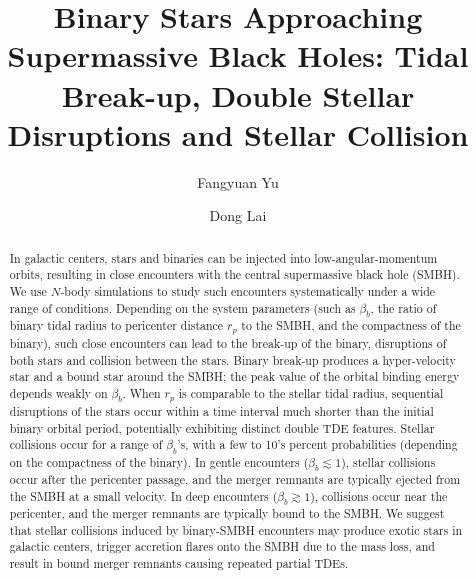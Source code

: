 \documentclass[twocolumn]{aastex631}
\begin{document}
\title{Binary Stars Approaching Supermassive Black Holes: Tidal Break-up, Double Stellar Disruptions and Stellar Collision}

\author[0009-0004-6973-3955]{Fangyuan Yu}

\author[0000-0002-1934-6250]{Dong Lai}

\begin{abstract}
In galactic centers, stars and binaries can be injected into low-angular-momentum orbits, resulting in close encounters with the central supermassive black hole (SMBH). 
We use $N$-body simulations to study such encounters systematically under a wide range of conditions.  
Depending on the system parameters (such as $\beta_b$, the ratio of binary tidal radius to pericenter distance $r_p$ to the SMBH, and the compactness of the binary), such close encounters can lead to the break-up of the binary, disruptions of both stars and collision between the stars. 
Binary break-up produces a hyper-velocity star and a bound star around the SMBH; the peak value of the orbital binding energy depends weakly on $\beta_b$. 
When $r_p$ is comparable to the stellar tidal radius, sequential disruptions of the stars occur within a time interval much shorter than the initial binary orbital period, potentially exhibiting distinct double TDE features. 
Stellar collisions occur for a range of $\beta_b$'s, with a few to 10's percent probabilities (depending on the compactness of the binary). 
In gentle encounters ($\beta_b\lesssim 1$), stellar collisions occur after the pericenter passage, and the merger remnants are typically ejected from the SMBH at a small velocity. 
In deep encounters ($\beta_b\gtrsim 1$), collisions occur near the pericenter, and the merger remnants are typically bound to the SMBH. 
We suggest that stellar collisions induced by binary-SMBH encounters may produce exotic stars in galactic centers, trigger accretion flares onto the SMBH due to the mass loss, and result in bound merger remnants causing repeated partial TDEs.
\end{abstract}
\end{document}
